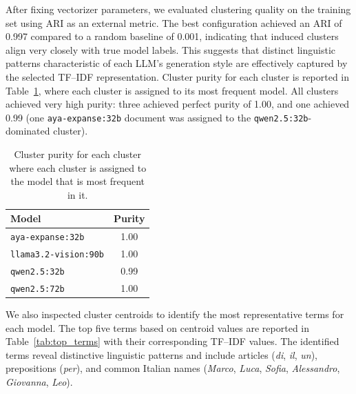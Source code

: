 \documentclass[11pt]{article}
\begin{document}
After fixing vectorizer parameters, we evaluated clustering quality on the training set using ARI as an external metric. The best configuration achieved an ARI of 0.997 compared to a random baseline of 0.001, indicating that induced clusters align very closely with true model labels. This suggests that distinct linguistic patterns characteristic of each LLM's generation style are effectively captured by the selected TF--IDF representation.
Cluster purity for each cluster is reported in Table~\ref{tab:cluster_purity}, where each cluster is assigned to its most frequent model. All clusters achieved very high purity: three achieved perfect purity of 1.00, and one achieved 0.99 (one \texttt{aya-expanse:32b} document was assigned to the \texttt{qwen2.5:32b}-dominated cluster).

\begin{table}
  \centering
  \small
  \begin{tabular}{lc}
    \toprule
    \textbf{Model} & \textbf{Purity} \\
    \midrule
    \texttt{aya-expanse:32b} & 1.00 \\
    \texttt{llama3.2-vision:90b} & 1.00 \\
    \texttt{qwen2.5:32b} & 0.99 \\
    \texttt{qwen2.5:72b} & 1.00 \\
    \bottomrule
  \end{tabular}
  \caption{Cluster purity for each cluster where each cluster is assigned to the model that is most frequent in it.}\label{tab:cluster_purity}
\end{table}

We also inspected cluster centroids to identify the most representative terms for each model. The top five terms based on centroid values are reported in Table~\ref{tab:top_terms} with their corresponding TF--IDF values. The identified terms reveal distinctive linguistic patterns and include articles (\emph{di}, \emph{il}, \emph{un}), prepositions (\emph{per}), and common Italian names (\emph{Marco}, \emph{Luca}, \emph{Sofia}, \emph{Alessandro}, \emph{Giovanna}, \emph{Leo}).
\end{document}

